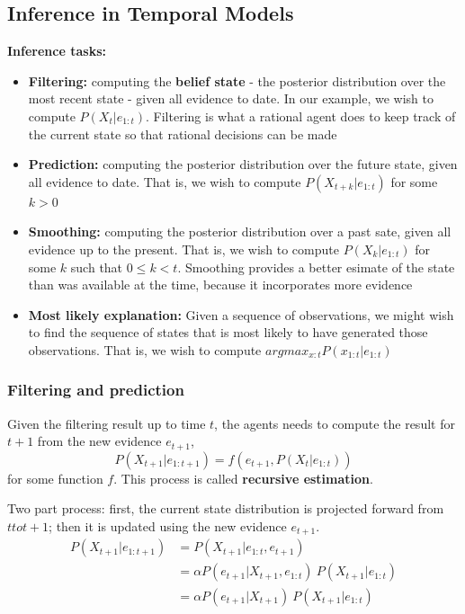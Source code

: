 \documentclass{scrartcl}
\begin{document}
\subsection{Inference in Temporal Models}
\textbf{Inference tasks:}
\begin{itemize}
    \item
        \textbf{Filtering:} computing the \textbf{belief state} - the posterior distribution over the most recent state - given all evidence to date. In our example, we wish to compute \(P(X_t|e_{1:t})\). Filtering is what a rational agent does to keep track of the current state so that rational decisions can be made
    \item
        \textbf{Prediction:} computing the posterior distribution over the future state, given all evidence to date. That is, we wish to compute \(P(X_{t+k}|e_{1:t})\) for some \(k>0\)
    \item
        \textbf{Smoothing:} computing the posterior distribution over a past sate, given all evidence up to the present. That is, we wish to compute \(P(X_k|e_{1:t})\) for some \(k\) such that \(0 \leq k < t\). Smoothing provides a better esimate of the state than was available at the time, because it incorporates more evidence
    \item
        \textbf{Most likely explanation:} Given a sequence of observations, we might wish to find the sequence of states that is most likely to have generated those observations. That is, we wish to compute \(argmax_{x:t} P(x_{1:t}|e_{1:t})\)
\end{itemize}

\subsubsection{Filtering and prediction}
Given the filtering result up to time \(t\), the agents needs to compute the result for \(t+1\) from the new evidence \(e_{t+1}\),
\[P(X_{t+1} | e_{1:t+1}) = f(e_{t+1}, P(X_t|e_{1:t}))\]
for some function \(f\). This process is called \textbf{recursive estimation}.

Two part process: first, the current state distribution is projected forward from \(t to t+1\); then it is updated using the new evidence \(e_{t+1}\).
\begin{align*}
    P(X_{t+1} | e_{1:t+1}) &= P(X_{t+1} | e_{1:t}, e_{t+1})\\
    &= \alpha P(e_{t+1} | X_{t+1}, e_{1:t}) \ P(X_{t+1} | e_{1:t})\\
    &= \alpha P(e_{t+1} | X_{t+1}) \ P(X_{t+1} | e_{1:t})
\end{align*}
\end{document}
